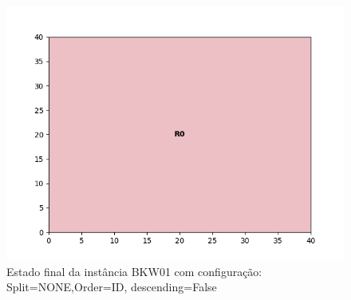 \begin{figure}[H]
    \centering
    \caption[]{Estado final da instância BKW01 com configuração: Split=NONE,Order=ID, descending=False}
    \label{fig:bkw01-none-id-false}
    \includegraphics[scale=0.5]{output/figures/bkw/bkw01/none/id/false/00}
\end{figure}